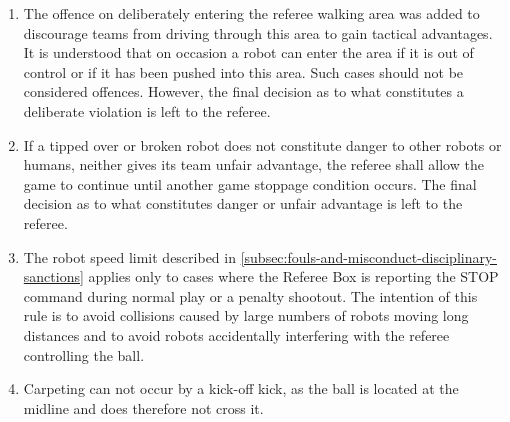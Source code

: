 \begin{enumerate}

\item
The offence on deliberately entering the referee walking area was added to discourage teams from driving through this area to gain tactical advantages.
It is understood that on occasion a robot can enter the area if it is out of control or if it has been pushed into this area.
Such cases should not be considered offences.
However, the final decision as to what constitutes a deliberate violation is left to the referee.

\item
If a tipped over or broken robot does not constitute danger to other robots or humans, neither gives its team unfair advantage, the referee shall allow the game to continue until another game stoppage condition occurs.
The final decision as to what constitutes danger or unfair advantage is left to the referee.

\item
The robot speed limit described in \autoref{subsec:fouls-and-misconduct-disciplinary-sanctions} applies only to cases where the Referee Box is reporting the STOP command during normal play or a penalty shootout.
The intention of this rule is to avoid collisions caused by large numbers of robots moving long distances and to avoid robots accidentally interfering with the referee controlling the ball.

\item
Carpeting can not occur by a kick-off kick, as the ball is located at the midline
and does therefore not cross it.
\end{enumerate}
